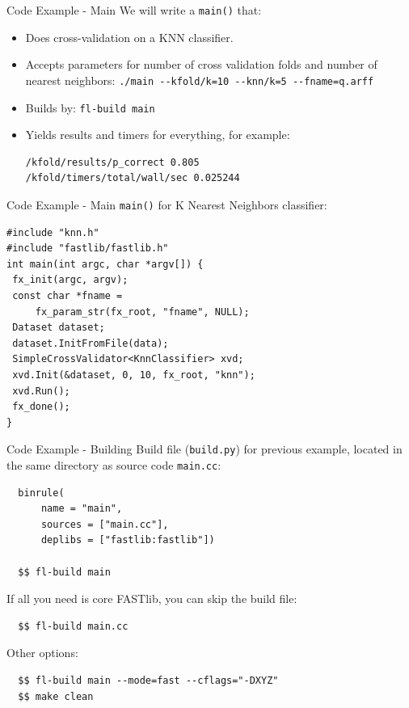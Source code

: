\documentclass[pdf,colorBG,slideColor]{prosper}
\begin{document}
\begin{slide}{Code Example - Main}
 \vspace*{.3in}
 We will write a {\tt main()} that: \\
 \begin{itemize}
 \item Does cross-validation on a KNN classifier.
 \item Accepts parameters for number of cross validation folds and number
 of nearest neighbors: \verb|./main --kfold/k=10 --knn/k=5 --fname=q.arff|
 \item Builds by: \verb|fl-build main|
 \item Yields results and timers for everything, for example:
\begin{verbatim}
/kfold/results/p_correct 0.805
/kfold/timers/total/wall/sec 0.025244
\end{verbatim}
 \end{itemize}
\end{slide}

\begin{slide}{Code Example - Main}
 {\tt main()} for K Nearest Neighbors classifier:
 \vspace*{.1in}
\begin{verbatim}
#include "knn.h"
#include "fastlib/fastlib.h"
int main(int argc, char *argv[]) {
 fx_init(argc, argv);
 const char *fname =
     fx_param_str(fx_root, "fname", NULL);
 Dataset dataset;
 dataset.InitFromFile(data);
 SimpleCrossValidator<KnnClassifier> xvd;
 xvd.Init(&dataset, 0, 10, fx_root, "knn");
 xvd.Run();
 fx_done();
}
\end{verbatim}
\end{slide}

\begin{slide}{Code Example - Building}
 Build file ({\tt build.py}) for previous example, located in
 the same directory as source code {\tt main.cc}:
 \vspace{0.05in}
\begin{verbatim}
  binrule(
      name = "main",
      sources = ["main.cc"],
      deplibs = ["fastlib:fastlib"])

  $$ fl-build main
\end{verbatim}
 \vspace{0.05in}
 If all you need is core FASTlib, you can skip the build file:
 \vspace{0.05in}
\begin{verbatim}
  $$ fl-build main.cc
\end{verbatim}
 \vspace{0.05in}
 Other options:
\begin{verbatim}
  $$ fl-build main --mode=fast --cflags="-DXYZ"
  $$ make clean
\end{verbatim}
 
\end{slide}
\end{document}
